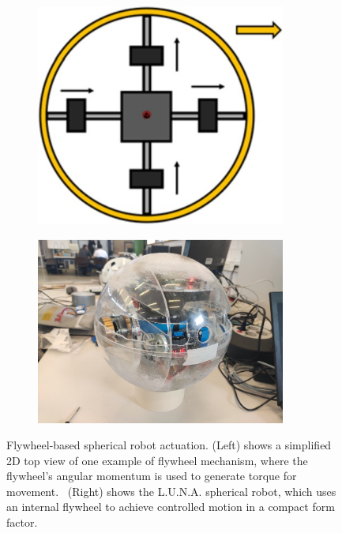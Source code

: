 \documentclass[english, bachelor, utf8]{base/thesis_telematics}
\begin{document}
\begin{figure}[ht]
\begin{subfigure}{0.48\textwidth}
    \centering
    \includegraphics[width=0.9\textwidth]{pics/flywheel_2D_top.jpg}
    \label{fig:flywheel_2D_top}
\end{subfigure}
\hfill
\begin{subfigure}{0.48\textwidth}
    \centering
    \includegraphics[width=0.9\textwidth]{pics/luna.png}
    \label{fig:luna_flywheel}
\end{subfigure}
\caption{Flywheel-based spherical robot actuation. (Left) shows a simplified 2D top view of one example of flywheel mechanism, where the flywheel's angular momentum is used to generate torque for movement.~\cite{SpheriDrive} (Right) shows the L.U.N.A. spherical robot, which uses an internal flywheel to achieve controlled motion in a compact form factor.}
\label{fig:flywheel_sphere}
\end{figure}
\end{document}
